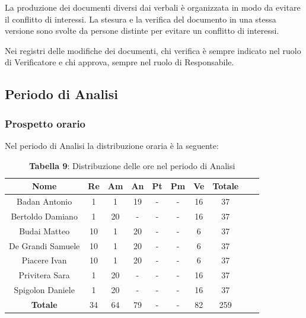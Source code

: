 La produzione dei documenti diversi dai verbali è organizzata in modo da evitare il conflitto di interessi. La stesura e la verifica del documento in una stessa versione sono svolte da persone distinte per evitare un conflitto di interessi.

Nei registri delle modifiche dei documenti, chi verifica è sempre indicato nel ruolo di Verificatore e chi approva, sempre nel ruolo di Responsabile. 


\subsection{Periodo di Analisi}
\subsubsection{Prospetto orario}
Nel periodo di Analisi la distribuzione oraria è la seguente:
\begin{table}[H]
	\centering
	\renewcommand{\arraystretch}{1.5}
	\begin{tabular}{|c|c|c|c|c|c|c|c|c|c|}
		\hline
		\rowcolor{lighter-grayer}
Nome & Re & Am & An & Pt & Pm & Ve & Totale \\ \hline
Badan Antonio & 1 & 1 & 19 & - & - & 16 & 37 \\ \hline
Bertoldo Damiano & 1 & 20 & - & - & - & 16 & 37 \\ \hline
Budai Matteo & 10 & 1 & 20 & - & - & 6 & 37 \\ \hline
De Grandi Samuele & 10 & 1 & 20 & - & - & 6 & 37 \\ \hline
Piacere Ivan & 10 & 1 & 20 & - & - & 6 & 37 \\ \hline
Privitera Sara & 1 & 20 & - & - & - & 16 & 37 \\ \hline
Spigolon Daniele & 1 & 20 & - & - & - & 16 & 37 \\ \hline
\textbf{Totale} & 34 & 64 & 79 & - & - & 82 & 259 \\ \hline
		
\end{tabular}
\caption*{\textbf{Tabella 9}: Distribuzione delle ore nel periodo di Analisi\\}
\end{table}	

